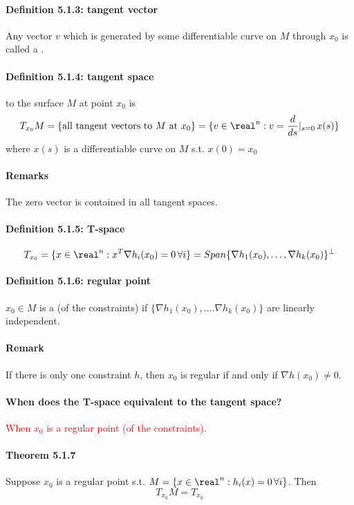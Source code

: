 \documentclass[11pt]{article}
\begin{document}
\paragraph{Definition 5.1.3: tangent vector}
Any vector $v$ which is generated by some differentiable curve on $M$ through $x_0$ is called a .

\paragraph{Definition 5.1.4: tangent space}
 to the surface $M$ at point $x_0$ is
$$T_{x_0} M = \{ \text{all tangent vectors to $M$ at $x_0$} \} \\
= \{v \in \real^n: v = \frac{d}{ds} |_{s=0} \, x(s)\}$$
where $x(s)$ is a differentiable curve on $M$ s.t. $x(0) = x_0$

\paragraph{Remarks}
The zero vector is contained in all tangent spaces.

\paragraph{Definition 5.1.5: T-space}
$$T_{x_0} = \{ x\in \real^n: x^T \nabla h_i(x_0) = 0 \, \forall i\} = Span\{ \nabla h_1(x_0), \hdots, \nabla h_k(x_0)\}^\perp$$

\paragraph{Definition 5.1.6: regular point}
$x_0 \in M$ is a  (of the constraints) if $\{ \nabla h_1(x_0), \hdots. \nabla h_k(x_0) \}$ are linearly independent.
\paragraph{Remark}
If there is only one constraint $h$, then $x_0$ is regular if and only if $\nabla h(x_0) \neq 0$.

\paragraph{When does the T-space equivalent to the tangent space?}
\textcolor{red}{When $x_0$ is a regular point (of the constraints).}

\paragraph{Theorem 5.1.7}
Suppose $x_0$ is a regular point s.t. $ M = \{ x \in \real^n: h_i(x) = 0 \, \forall i\}$. Then
$$T_{x_0}M = T_{x_0}$$
\end{document}
